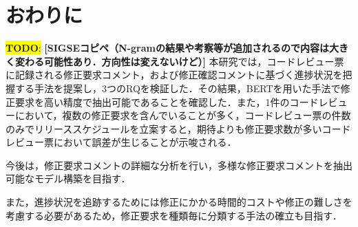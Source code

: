 \documentclass[11pt]{jreport}
\newcommand{\todo}[1]{\colorbox{yellow}{{\bf TODO}:}{\color{red} {\textbf{[#1]}}}}
\begin{document}
\chapter{おわりに}\label{chap:conclusion}

\todo{SIGSEコピペ（N-gramの結果や考察等が追加されるので内容は大きく変わる可能性あり．方向性は変えないけど）}
本研究では，コードレビュー票に記録される修正要求コメント，および修正確認コメントに基づく進捗状況を把握する手法を提案し，3つのRQを検証した．その結果，BERTを用いた手法で修正要求を高い精度で抽出可能であることを確認した．また，1件のコードレビューにおいて，複数の修正要求を含んでいることが多く，コードレビュー票の件数のみでリリーススケジュールを立案すると，期待よりも修正要求数が多いコードレビュー票において誤差が生じることが示唆される．

今後は，修正要求コメントの詳細な分析を行い，多様な修正要求コメントを抽出可能なモデル構築を目指す．

また，進捗状況を追跡するためには修正にかかる時間的コストや修正の難しさを考慮する必要があるため，修正要求を種類毎に分類する手法の確立も目指す．
\end{document}
